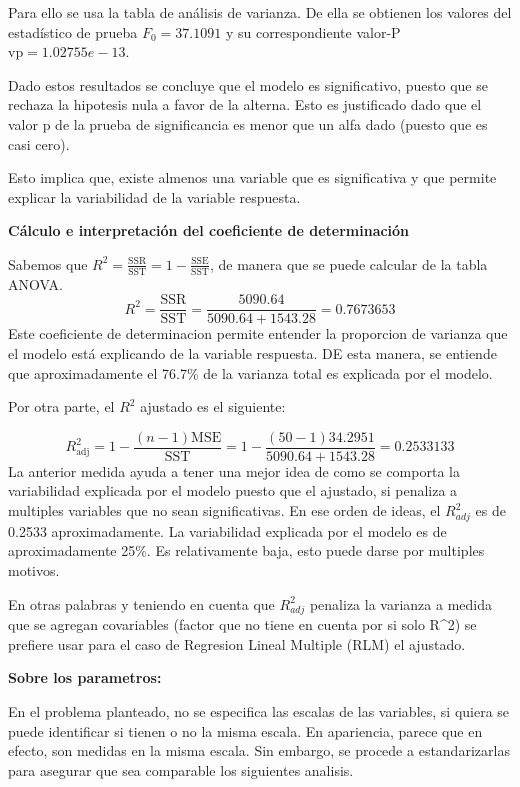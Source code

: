 \documentclass[
]{article}
\begin{document}
Para ello se usa la tabla de análisis de varianza. De ella se obtienen
los valores del estadístico de prueba \(F_0 =37.1091\) y su
correspondiente valor-P \(\text{vp} = 1.02755e-13\).

Dado estos resultados se concluye que el modelo es significativo, puesto
que se rechaza la hipotesis nula a favor de la alterna. Esto es
justificado dado que el valor p de la prueba de significancia es menor
que un alfa dado (puesto que es casi cero).

Esto implica que, existe almenos una variable que es significativa y que
permite explicar la variabilidad de la variable respuesta.

\textbf{Cálculo e interpretación del coeficiente de determinación}

Sabemos que
\(R^2 = \frac{\text{SSR}}{\text{SST}} = 1 - \frac{\text{SSE}}{\text{SST}}\),
de manera que se puede calcular de la tabla ANOVA.
\[R^2 = \frac{\text{SSR}}{\text{SST}} = \frac{5090.64}{5090.64 + 1543.28} = 0.7673653\]
Este coeficiente de determinacion permite entender la proporcion de
varianza que el modelo está explicando de la variable respuesta. DE esta
manera, se entiende que aproximadamente el 76.7\% de la varianza total
es explicada por el modelo.

Por otra parte, el \(R^2\) ajustado es el siguiente:

\[R_{\text{adj}}^2 = 1 - \frac{\left(n - 1\right)\text{MSE}}{\text{SST}} = 1 - \frac{\left(50 - 1\right)34.2951}{5090.64+1543.28} = 0.2533133\]
La anterior medida ayuda a tener una mejor idea de como se comporta la
variabilidad explicada por el modelo puesto que el ajustado, si penaliza
a multiples variables que no sean significativas. En ese orden de ideas,
el \(R^2_{adj}\) es de 0.2533 aproximadamente. La variabilidad explicada
por el modelo es de aproximadamente 25\%. Es relativamente baja, esto
puede darse por multiples motivos.

En otras palabras y teniendo en cuenta que \(R^2_{adj}\) penaliza la
varianza a medida que se agregan covariables (factor que no tiene en
cuenta por si solo R\^{}2) se prefiere usar para el caso de Regresion
Lineal Multiple (RLM) el ajustado.

\textbf{Sobre los parametros:}

En el problema planteado, no se especifica las escalas de las variables,
si quiera se puede identificar si tienen o no la misma escala. En
apariencia, parece que en efecto, son medidas en la misma escala. Sin
embargo, se procede a estandarizarlas para asegurar que sea comparable
los siguientes analisis.
\end{document}
